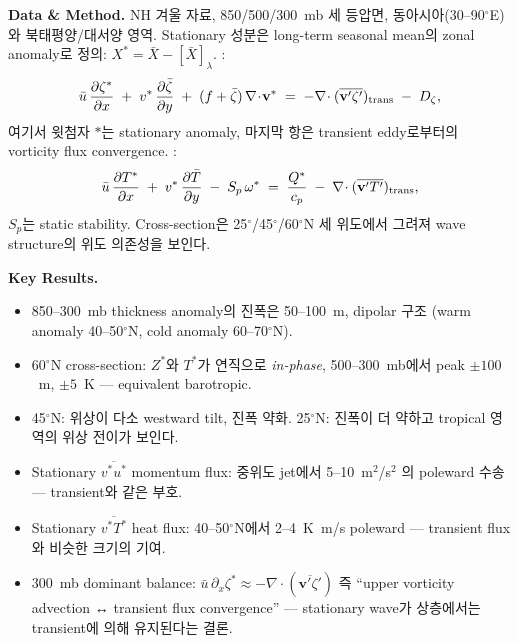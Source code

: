 \medskip
\noindent\textbf{Data \& Method.}\quad
NH 겨울 자료, 850/500/300~mb 세 등압면, 동아시아(30--90$^\circ$E)와 북태평양/대서양 영역.
Stationary 성분은 long-term seasonal mean의 zonal anomaly로 정의: $X^* = \bar X - [\bar X]_\lambda$.
:
\begin{equation}\label{eq:ch06_dd_lau79b_vortbal}
  \bar u\,\frac{\partial \zeta^*}{\partial x}
  \;+\; v^*\,\frac{\partial \bar\zeta}{\partial y}
  \;+\; (f+\bar\zeta)\,\nabla\!\cdot\!\mathbf{v}^*
  \;=\; -\nabla\!\cdot(\overline{\mathbf{v}'\zeta'})_{\text{trans}}
  \;-\; D_\zeta,
\end{equation}
여기서 윗첨자 $*$는 stationary anomaly, 마지막 항은 transient eddy로부터의 vorticity flux convergence.
:
\begin{equation}\label{eq:ch06_dd_lau79b_heatbal}
  \bar u\,\frac{\partial T^*}{\partial x}
  \;+\; v^*\,\frac{\partial \bar T}{\partial y}
  \;-\; S_p\,\omega^*
  \;=\; \frac{Q^*}{c_p}
  \;-\; \nabla\!\cdot(\overline{\mathbf{v}'T'})_{\text{trans}},
\end{equation}
$S_p$는 static stability.  Cross-section은 25$^\circ$/45$^\circ$/60$^\circ$N 세 위도에서
그려져 wave structure의 위도 의존성을 보인다.

\medskip
\noindent\textbf{Key Results.}
\begin{itemize}
  \item 850--300~mb thickness anomaly의 진폭은 50--100~m, dipolar 구조
        (warm anomaly 40--50$^\circ$N, cold anomaly 60--70$^\circ$N).
  \item 60$^\circ$N cross-section: $Z^*$와 $T^*$가 연직으로 \emph{in-phase},
        500--300~mb에서 peak $\pm 100$~m, $\pm 5$~K --- equivalent barotropic.
  \item 45$^\circ$N: 위상이 다소 westward tilt, 진폭 약화. 25$^\circ$N: 진폭이 더 약하고
        tropical 영역의 위상 전이가 보인다.
  \item Stationary $\overline{v^* u^*}$ momentum flux: 중위도 jet에서 5--10~m$^2$/s$^2$
        의 poleward 수송 --- transient와 같은 부호.
  \item Stationary $\overline{v^* T^*}$ heat flux: 40--50$^\circ$N에서 2--4~K~m/s
        poleward --- transient flux와 비슷한 크기의 기여.
  \item 300~mb dominant balance: $\bar u\,\partial_x \zeta^* \approx -\nabla\cdot(\overline{\mathbf{v}'\zeta'})$
        즉 ``upper vorticity advection ↔ transient flux convergence'' ---
        stationary wave가 상층에서는 transient에 의해 유지된다는 결론.
\end{itemize}


